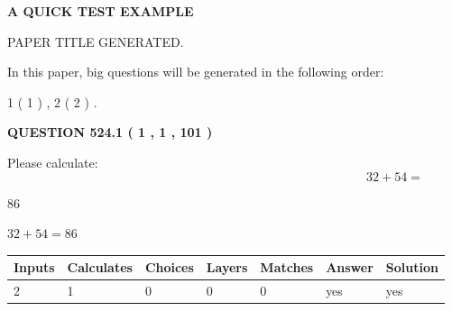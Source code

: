 \documentclass[12pt]{article}
\begin{document}
   
 \vspace{0.2in}
{\LARGE {\textbf{ A QUICK TEST EXAMPLE}}}
   
   
 PAPER TITLE GENERATED.
   
   
   
\vspace{0.2in}
   
In this paper, big questions will be generated in the following order: 
   
   
   1 ( 1 )
 ,
   2 ( 2 )
 .
  
\vspace{0.2in}
  
{\textbf{\Large{QUESTION
524.1 
 ( 1 , 1 , 101 )
}}}
  
  
 
Please calculate:
\begin{equation}
32 +  %
54 = \nonumber
\end{equation}
 
 
 
\noindent{}
 
 

86
 
 
\noindent{}
 
 

 
 
 
\noindent{}
 
 

$ %
32 +  %
54=   %
86$
 
 
\noindent{}
 
 

 
   
   
   
   
\noindent\begin{tabular}{|l|l|l|l|l|l|l|}
 \hline
Inputs & Calculates & Choices & Layers & Matches & Answer & Solution \\ \hline
 2  & 
 1  & 
 0
  & 
 0  & 
 0  & 
  yes & 
  yes 
  \\ \hline
 \end{tabular}
   
   
   
   
\noindent{}
   
\end{document}
